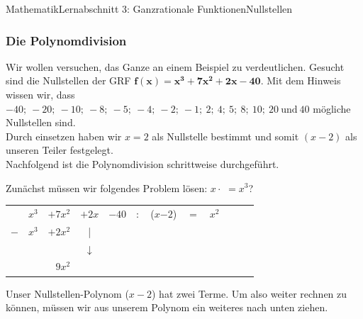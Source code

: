 \documentclass[11pt,twocolumn,oneside,openany,headings=optiontotoc,11pt,numbers=noenddot]{article}
\begin{document}
\begin{worksheet}{Mathematik}{Lernabschnitt 3: Ganzrationale Funktionen}{Nullstellen}
		\subsubsection*{Die Polynomdivision}
		Wir wollen versuchen, das Ganze an einem Beispiel zu verdeutlichen. Gesucht sind die Nullstellen der GRF \(\mathbf{f(x) = x^3+7x^2+2x-40}\). Mit dem Hinweis wissen wir, dass \(\mathit{-40;\ -20;\ -10;\ -8;\ -5;\ -4;\ -2;\ -1;\ 2;\ 4;\ 5;\ 8;\ 10;\ 20}\ \text{und}\ \mathit{40}\) mögliche Nullstellen sind.\\
		Durch einsetzen haben wir \(x=2\) als Nullstelle bestimmt und somit \((x-2)\) als unseren Teiler festgelegt.\\
		Nachfolgend ist die Polynomdivision schrittweise durchgeführt.\\\par\noindent
		Zunächst müssen wir folgendes Problem lösen: \(x\cdot{}\) \( = x^3\)?
		\par\noindent
		\begin{tabularx}{0.5\textwidth}{rlllllllllll}
			& \colorbox{green!10}{\(x^3\)} & \(+\)\(7x^2\) & \(+\)\(2x\) & \(-\)\(40\) & \(:\) & (\colorbox{green!10}{\(x\)}\(-\)\(2\)) & \(=\) & \underline{\(x^2\)} & & & \\
			\(-\) & \colorbox{green!10}{\(x^3\)} & \( +\)\(2x^2\) & \multicolumn{1}{c}{|} & & \multicolumn{5}{l}{\color{codegray}{\small{\textit{\(-[x^2(x-2)] = -[x^3-2x^2] = -x^3 - 2x^2\)}}}}\\
			\cline{1-3}
			& & & \multicolumn{1}{c}{\(\downarrow\)}\\
			& & \multicolumn{1}{r}{\(9x^2\)}
		\end{tabularx}
		\par\noindent
		Unser \grq{}Nullstellen-Polynom\grq{} (\(x-2\)) hat zwei Terme. Um also weiter rechnen zu können, müssen wir aus unserem Polynom ein weiteres nach unten ziehen.
		\begin{framed}
			\noindent
		\end{framed}\normalsize\normalcolor
		\begin{tabularx}{0.5\textwidth}{rlllllllllll}

\end{tabularx}
\end{worksheet}
\end{document}
